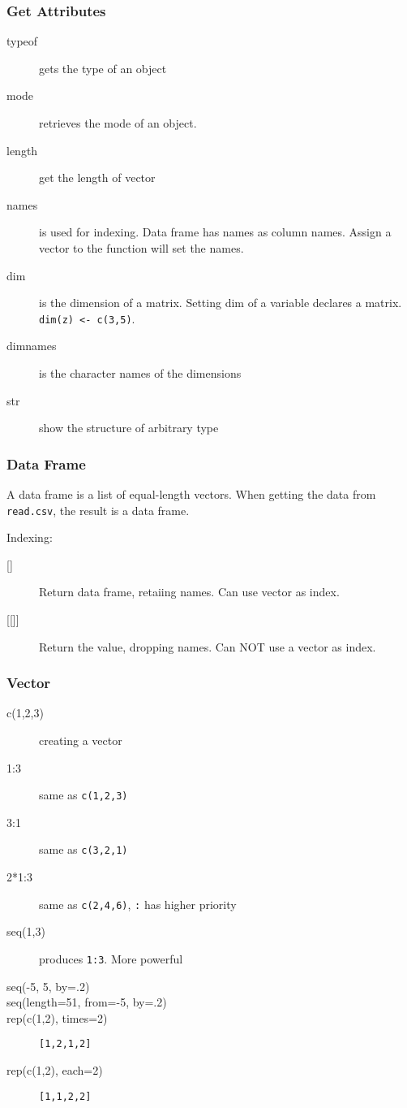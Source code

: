\subsubsection{Get Attributes}
\begin{description}
\item [typeof] gets the type of an object
\item [mode] retrieves the mode of an object.
\item [length] get the length of vector
\item [names] is used for indexing. Data frame has names as column
  names. Assign a vector to the function will set the names.
\item [dim] is the dimension of a matrix. Setting dim of a variable
  declares a matrix. \texttt{dim(z) <- c(3,5)}.
\item [dimnames] is the character names of the dimensions
\item [str] show the structure of arbitrary type
\end{description}

\subsubsection{Data Frame}
A data frame is a list of equal-length vectors.  When getting the data
from \texttt{read.csv}, the result is a data frame.

Indexing:

\begin{description}
\item [{[]}] Return data frame, retaiing names. Can use vector as index.
\item [{[[]]}] Return the value, dropping names. Can NOT use a vector as index.
\end{description}

\subsubsection{Vector}
\begin{description}
\item [c(1,2,3)] creating a vector
\item [1:3] same as \texttt{c(1,2,3)}
\item [3:1] same as \texttt{c(3,2,1)}
\item [2*1:3] same as \texttt{c(2,4,6)}, \texttt{:} has higher priority
\item [seq(1,3)] produces \texttt{1:3}. More powerful
\item [seq(-5, 5, by=.2)]
\item [seq(length=51, from=-5, by=.2)]
\item [rep(c(1,2), times=2)] \verb$[1,2,1,2]$
\item [rep(c(1,2), each=2)] \verb$[1,1,2,2]$
\end{description}


